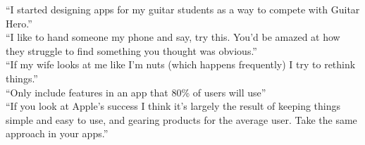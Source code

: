 \documentclass[36pt]{amsart}
\begin{document}
{\Huge``I started designing apps for my guitar students as a way to compete with Guitar Hero.''}\\

{\Huge``I like to hand someone my phone and say, try this. You'd be amazed at how they struggle to find 
something you thought was obvious.''}\\

{\Huge``If my wife looks at me like I'm nuts (which happens frequently) I try to rethink things.''}\\

{\Huge``Only include features in an app that 80\% of users will use''}\\

{\Huge``If you look at Apple's success I think it's largely the result of keeping things simple and easy to use, and gearing products for the average user. Take the same approach in your apps.''}\\
\end{document}
